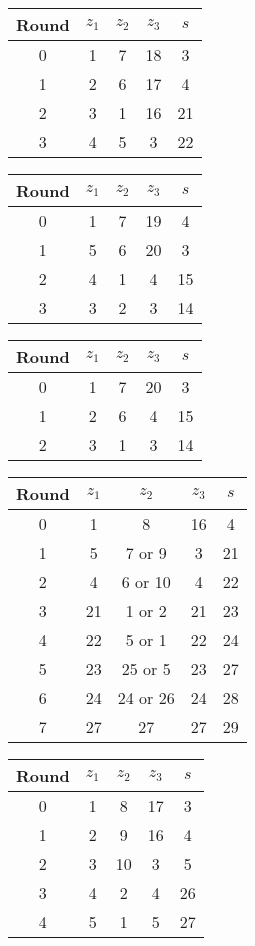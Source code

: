 \begin{multicols}{2}
\begin{tabular}{c | c | c | c | c }
Round & $z_1$ & $z_2$ & $z_3$ & $s$ \\
\hline
0 & 1 & 7 & 18 & 3 \\
1 & 2 & 6 & 17 & 4 \\
2 & 3 & 1 & 16 & 21 \\
3 & 4 & 5 & 3 & 22
\end{tabular}


\begin{tabular}{c | c | c | c | c }
Round & $z_1$ & $z_2$ & $z_3$ & $s$ \\
\hline
0 & 1 & 7 & 19 & 4 \\
1 & 5 & 6 & 20 & 3 \\
2 & 4 & 1 & 4 & 15 \\
3 & 3 & 2 & 3 & 14
\end{tabular}


\begin{tabular}{c | c | c | c | c }
Round & $z_1$ & $z_2$ & $z_3$ & $s$ \\
\hline
0 & 1 & 7 & 20 & 3 \\
1 & 2 & 6 & 4 & 15 \\
2 & 3 & 1 & 3 & 14
\end{tabular}


\begin{tabular}{c | c | c | c | c }
Round & $z_1$ & $z_2$ & $z_3$ & $s$ \\
\hline
0 & 1 & 8 & 16 & 4 \\
1 & 5 & 7 or 9 & 3 & 21 \\
2 & 4 & 6 or 10 & 4 &  22 \\
3 & 21 & 1 or 2 & 21 & 23 \\
4 & 22 & 5 or 1 & 22 & 24 \\
5 & 23 & 25 or 5 & 23 & 27 \\
6 & 24 & 24 or 26 & 24 & 28 \\
7 & 27 & 27 & 27 & 29
\end{tabular}


\begin{tabular}{c | c | c | c | c }
Round & $z_1$ & $z_2$ & $z_3$ & $s$ \\
\hline
0 & 1 & 8 & 17 & 3 \\
1 & 2 & 9 & 16 & 4 \\
2 & 3 & 10 & 3 & 5 \\
3 & 4 & 2 & 4 & 26 \\
4 & 5 & 1 & 5 & 27
\end{tabular}



\end{multicols}
